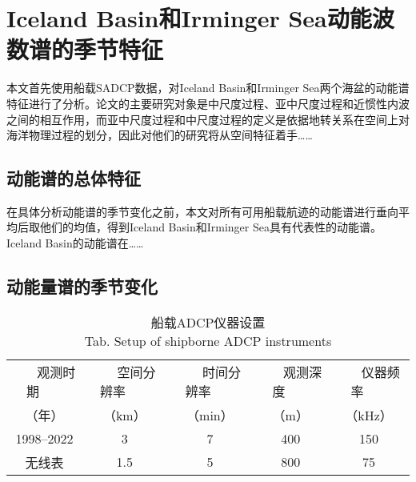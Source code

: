 \chapter{Iceland Basin和Irminger Sea动能波数谱的季节特征}

本文首先使用船载SADCP数据，对Iceland Basin和Irminger Sea两个海盆的动能谱特征进行了分析。论文的主要研究对象是中尺度过程、亚中尺度过程和近惯性内波之间的相互作用，而亚中尺度过程和中尺度过程的定义是依据地转关系在空间上对海洋物理过程的划分，因此对他们的研究将从空间特征着手……

\section{动能谱的总体特征}

在具体分析动能谱的季节变化之前，本文对所有可用船载航迹的动能谱进行垂向平均后取他们的均值，得到Iceland Basin和Irminger Sea具有代表性的动能谱。Iceland Basin的动能谱在……

\section{动能量谱的季节变化}

\begin{table}[htb]
  \centering\small
  \caption{船载ADCP仪器设置\\
  Tab. \thetable Setup of shipborne ADCP instruments}
  \label{tab:exampletable}
  \begin{tabular}{ccccc}
    \hline\toprule
    ~~~ 观测时期 ~~~   & ~~~ 空间分辨率 ~~~  & ~~~ 时间分辨率 ~~~  & ~~~ 观测深度 ~~~ & ~~~ 仪器频率 ~~~  \\
    （年） & （km） & （min） & （m） & （kHz）  \\
    \midrule
    1998--2022 & 3 & 7 & 400 & 150 \\
    无线表 & 1.5 & 5 & 800 & 75   \\
    \bottomrule\hline
  \end{tabular}
\end{table}

